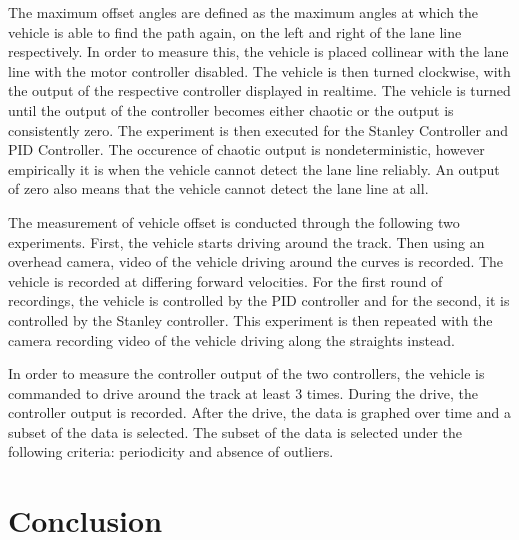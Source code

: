 \documentclass[arbeit=studie,oneside,BCOR=12mm]{ArbeitRST}
\begin{document}
The maximum offset angles are defined as the maximum angles at which the
vehicle is able to find the path again, on the left and right of the lane line
respectively. In order to measure this, the vehicle is placed collinear with
the lane line with the motor controller disabled. The vehicle is then turned
clockwise, with the output of the respective controller displayed in realtime.
The vehicle is turned until the output of the controller becomes either chaotic
or the output is consistently zero. The experiment is then executed for the
Stanley Controller and PID Controller. The occurence of chaotic output is
nondeterministic, however empirically it is when the vehicle cannot detect the
lane line reliably. An output of zero also means that the vehicle cannot detect
the lane line at all.

The measurement of vehicle offset is conducted through the following two
experiments. First, the vehicle starts driving around the track. Then using an
overhead camera, video of the vehicle driving around the curves is recorded.
The vehicle is recorded at differing forward velocities. For the first round of
recordings, the vehicle is controlled by the PID controller and for the second,
it is controlled by the Stanley controller. This experiment is then repeated
with the camera recording video of the vehicle driving along the straights
instead. 

In order to measure the controller output of the two controllers, the vehicle
is commanded to drive around the track at least 3 times. During the drive, the
controller output is recorded. After the drive, the data is graphed over time
and a subset of the data is selected. The subset of the data is selected under
the following criteria: periodicity and absence of outliers.


\chapter{Conclusion}
\end{document}
